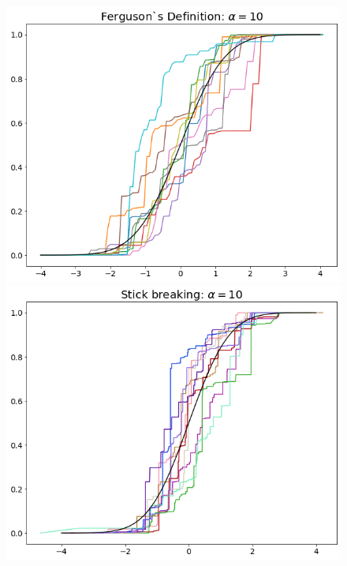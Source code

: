\documentclass[a4paper, 10pt]{article}
\begin{document}
\begin{enumerate}
\begin{enumerate}
\begin{center}
\begin{figure}
                \includegraphics[scale = 0.3]{a1-3.png}\includegraphics[scale = 0.3]{a1-7.png}

\end{figure}
\end{center}
\end{enumerate}
\end{enumerate}
\end{document}
